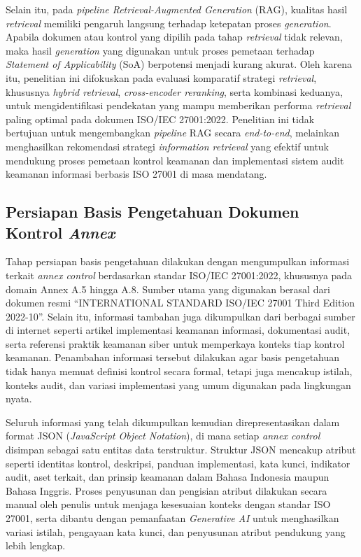 Selain itu, pada \textit{pipeline Retrieval-Augmented Generation} (RAG), kualitas hasil \textit{retrieval} memiliki pengaruh langsung terhadap ketepatan proses \textit{generation}. Apabila dokumen atau kontrol yang dipilih pada tahap \textit{retrieval} tidak relevan, maka hasil \textit{generation} yang digunakan untuk proses pemetaan terhadap \textit{Statement of Applicability} (SoA) berpotensi menjadi kurang akurat. Oleh karena itu, penelitian ini difokuskan pada evaluasi komparatif strategi \textit{retrieval}, khususnya \textit{hybrid retrieval}, \textit{cross-encoder reranking}, serta kombinasi keduanya, untuk mengidentifikasi pendekatan yang mampu memberikan performa \textit{retrieval} paling optimal pada dokumen ISO/IEC 27001:2022. Penelitian ini tidak bertujuan untuk mengembangkan \textit{pipeline} RAG secara \textit{end-to-end}, melainkan menghasilkan rekomendasi strategi \textit{information retrieval} yang efektif untuk mendukung proses pemetaan kontrol keamanan dan implementasi sistem audit keamanan informasi berbasis ISO 27001 di masa mendatang.

\subsection{Persiapan Basis Pengetahuan Dokumen Kontrol \textit{Annex}}

Tahap persiapan basis pengetahuan dilakukan dengan mengumpulkan informasi terkait \textit{annex control} berdasarkan standar ISO/IEC 27001:2022, khususnya pada domain Annex A.5 hingga A.8. Sumber utama yang digunakan berasal dari dokumen resmi ``INTERNATIONAL STANDARD ISO/IEC 27001 Third Edition 2022-10''. Selain itu, informasi tambahan juga dikumpulkan dari berbagai sumber di internet seperti artikel implementasi keamanan informasi, dokumentasi audit, serta referensi praktik keamanan siber untuk memperkaya konteks tiap kontrol keamanan. Penambahan informasi tersebut dilakukan agar basis pengetahuan tidak hanya memuat definisi kontrol secara formal, tetapi juga mencakup istilah, konteks audit, dan variasi implementasi yang umum digunakan pada lingkungan nyata.

Seluruh informasi yang telah dikumpulkan kemudian direpresentasikan dalam format JSON (\textit{JavaScript Object Notation}), di mana setiap \textit{annex control} disimpan sebagai satu entitas data terstruktur. Struktur JSON mencakup atribut seperti identitas kontrol, deskripsi, panduan implementasi, kata kunci, indikator audit, aset terkait, dan prinsip keamanan dalam Bahasa Indonesia maupun Bahasa Inggris. Proses penyusunan dan pengisian atribut dilakukan secara manual oleh penulis untuk menjaga kesesuaian konteks dengan standar ISO 27001, serta dibantu dengan pemanfaatan \textit{Generative AI} untuk menghasilkan variasi istilah, pengayaan kata kunci, dan penyusunan atribut pendukung yang lebih lengkap.


